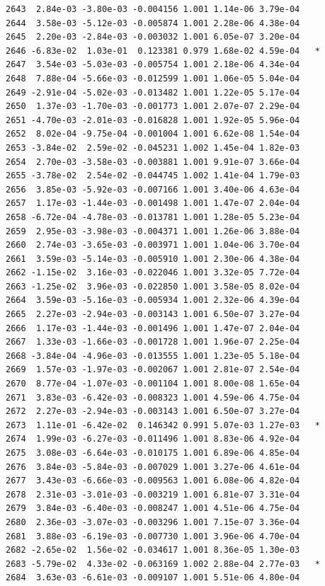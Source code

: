 \documentclass[
  letterpaper,
  DIV=11,
  numbers=noendperiod]{scrartcl}
\begin{document}
\begin{verbatim}
2643  2.84e-03 -3.80e-03 -0.004156 1.001 1.14e-06 3.79e-04    
2644  3.58e-03 -5.12e-03 -0.005874 1.001 2.28e-06 4.38e-04    
2645  2.20e-03 -2.84e-03 -0.003032 1.001 6.05e-07 3.20e-04    
2646 -6.83e-02  1.03e-01  0.123381 0.979 1.68e-02 4.59e-04   *
2647  3.54e-03 -5.03e-03 -0.005754 1.001 2.18e-06 4.34e-04    
2648  7.88e-04 -5.66e-03 -0.012599 1.001 1.06e-05 5.04e-04    
2649 -2.91e-04 -5.02e-03 -0.013482 1.001 1.22e-05 5.17e-04    
2650  1.37e-03 -1.70e-03 -0.001773 1.001 2.07e-07 2.29e-04    
2651 -4.70e-03 -2.01e-03 -0.016828 1.001 1.92e-05 5.96e-04    
2652  8.02e-04 -9.75e-04 -0.001004 1.001 6.62e-08 1.54e-04    
2653 -3.84e-02  2.59e-02 -0.045231 1.002 1.45e-04 1.82e-03    
2654  2.70e-03 -3.58e-03 -0.003881 1.001 9.91e-07 3.66e-04    
2655 -3.78e-02  2.54e-02 -0.044745 1.002 1.41e-04 1.79e-03    
2656  3.85e-03 -5.92e-03 -0.007166 1.001 3.40e-06 4.63e-04    
2657  1.17e-03 -1.44e-03 -0.001498 1.001 1.47e-07 2.04e-04    
2658 -6.72e-04 -4.78e-03 -0.013781 1.001 1.28e-05 5.23e-04    
2659  2.95e-03 -3.98e-03 -0.004371 1.001 1.26e-06 3.88e-04    
2660  2.74e-03 -3.65e-03 -0.003971 1.001 1.04e-06 3.70e-04    
2661  3.59e-03 -5.14e-03 -0.005910 1.001 2.30e-06 4.38e-04    
2662 -1.15e-02  3.16e-03 -0.022046 1.001 3.32e-05 7.72e-04    
2663 -1.25e-02  3.96e-03 -0.022850 1.001 3.58e-05 8.02e-04    
2664  3.59e-03 -5.16e-03 -0.005934 1.001 2.32e-06 4.39e-04    
2665  2.27e-03 -2.94e-03 -0.003143 1.001 6.50e-07 3.27e-04    
2666  1.17e-03 -1.44e-03 -0.001496 1.001 1.47e-07 2.04e-04    
2667  1.33e-03 -1.66e-03 -0.001728 1.001 1.96e-07 2.25e-04    
2668 -3.84e-04 -4.96e-03 -0.013555 1.001 1.23e-05 5.18e-04    
2669  1.57e-03 -1.97e-03 -0.002067 1.001 2.81e-07 2.54e-04    
2670  8.77e-04 -1.07e-03 -0.001104 1.001 8.00e-08 1.65e-04    
2671  3.83e-03 -6.42e-03 -0.008323 1.001 4.59e-06 4.75e-04    
2672  2.27e-03 -2.94e-03 -0.003143 1.001 6.50e-07 3.27e-04    
2673  1.11e-01 -6.42e-02  0.146342 0.991 5.07e-03 1.27e-03   *
2674  1.99e-03 -6.27e-03 -0.011496 1.001 8.83e-06 4.92e-04    
2675  3.08e-03 -6.64e-03 -0.010175 1.001 6.89e-06 4.85e-04    
2676  3.84e-03 -5.84e-03 -0.007029 1.001 3.27e-06 4.61e-04    
2677  3.43e-03 -6.66e-03 -0.009563 1.001 6.08e-06 4.82e-04    
2678  2.31e-03 -3.01e-03 -0.003219 1.001 6.81e-07 3.31e-04    
2679  3.84e-03 -6.40e-03 -0.008247 1.001 4.51e-06 4.75e-04    
2680  2.36e-03 -3.07e-03 -0.003296 1.001 7.15e-07 3.36e-04    
2681  3.88e-03 -6.19e-03 -0.007730 1.001 3.96e-06 4.70e-04    
2682 -2.65e-02  1.56e-02 -0.034617 1.001 8.36e-05 1.30e-03    
2683 -5.79e-02  4.33e-02 -0.063169 1.002 2.88e-04 2.77e-03   *
2684  3.63e-03 -6.61e-03 -0.009107 1.001 5.51e-06 4.80e-04    

\end{verbatim}
\end{document}
